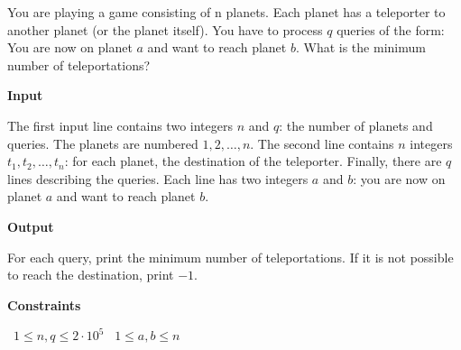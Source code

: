 You are playing a game consisting of n planets. Each planet has a teleporter to another planet (or the planet itself).
You have to process $q$ queries of the form: You are now on planet $a$ and want to reach planet $b$. What is the minimum number of teleportations?

\vspace{0.3cm}\noindent\textbf{Input}

The first input line contains two integers $n$ and $q$: the number of planets and queries. The planets are numbered $1,2,\ldots,n$.
The second line contains $n$ integers $t_1,t_2,\ldots,t_n$: for each planet, the destination of the teleporter.
Finally, there are $q$ lines describing the queries. Each line has two integers $a$ and $b$: you are now on planet $a$ and want to reach planet $b$.

\vspace{0.3cm}\noindent\textbf{Output}

For each query, print the minimum number of teleportations. If it is not possible to reach the destination, print $-1$.

\vspace{0.3cm}\noindent\textbf{Constraints}

\textbullet\ $1 \le n, q \le 2 \cdot 10^5$
\textbullet\ $1 \le a,b \le n$
